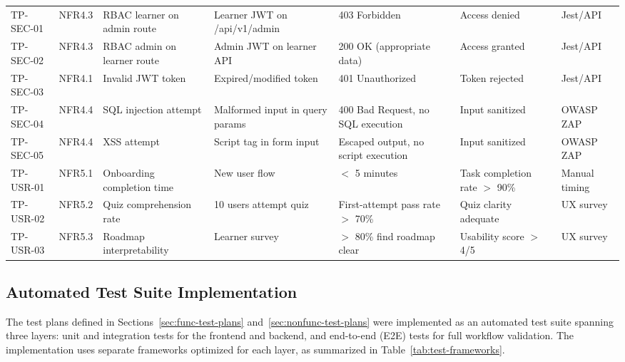 \begin{longtable}{p{1.8cm}p{1.5cm}p{2.5cm}p{2.5cm}p{2.5cm}p{1.8cm}p{1.2cm}}
TP-SEC-01 & NFR4.3 & RBAC learner on admin route & Learner JWT on /api/v1/admin & 403 Forbidden & Access denied & Jest/API \\
TP-SEC-02 & NFR4.3 & RBAC admin on learner route & Admin JWT on learner API & 200 OK (appropriate data) & Access granted & Jest/API \\
TP-SEC-03 & NFR4.1 & Invalid JWT token & Expired/modified token & 401 Unauthorized & Token rejected & Jest/API \\
TP-SEC-04 & NFR4.4 & SQL injection attempt & Malformed input in query params & 400 Bad Request, no SQL execution & Input sanitized & OWASP ZAP \\
TP-SEC-05 & NFR4.4 & XSS attempt & Script tag in form input & Escaped output, no script execution & Input sanitized & OWASP ZAP \\
TP-USR-01 & NFR5.1 & Onboarding completion time & New user flow & $<$ 5 minutes & Task completion rate $>$ 90\% & Manual timing \\
TP-USR-02 & NFR5.2 & Quiz comprehension rate & 10 users attempt quiz & First-attempt pass rate $>$ 70\% & Quiz clarity adequate & UX survey \\
TP-USR-03 & NFR5.3 & Roadmap interpretability & Learner survey & $>$ 80\% find roadmap clear & Usability score $>$ 4/5 & UX survey \\
\bottomrule
\end{longtable}

\subsection{Automated Test Suite Implementation}

The test plans defined in Sections~\ref{sec:func-test-plans} and~\ref{sec:nonfunc-test-plans} were implemented as an automated test suite spanning three layers: unit and integration tests for the frontend and backend, and end-to-end (E2E) tests for full workflow validation. The implementation uses separate frameworks optimized for each layer, as summarized in Table~\ref{tab:test-frameworks}.


